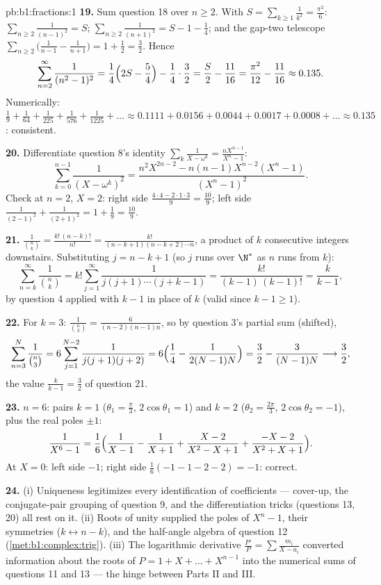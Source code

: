 \begin{solution}{pb:b1:fractions:1}
\textbf{19.} Sum question 18 over $n \geq 2$. With $S =
\sum_{k\geq1}\frac1{k^2} = \frac{\pi^2}6$: $\sum_{n\geq2}
\frac1{(n-1)^2} = S$; $\sum_{n\geq2}\frac1{(n+1)^2} = S - 1 -
\frac14$; and the gap-two telescope $\sum_{n\geq2}\bigl(
\frac1{n-1} - \frac1{n+1}\bigr) = 1 + \frac12 = \frac32$. Hence
\[
\sum_{n=2}^{\infty}\frac1{(n^2-1)^2}
= \frac14\Bigl(2S - \frac54\Bigr) - \frac14\cdot\frac32
= \frac S2 - \frac{11}{16}
= \frac{\pi^2}{12} - \frac{11}{16} \approx 0.135 .
\]
Numerically: $\frac19 + \frac1{64} + \frac1{225} + \frac1{576} +
\frac1{1225} + \dots \approx 0.1111 + 0.0156 + 0.0044 + 0.0017 +
0.0008 + \dots \approx 0.135$: consistent.

\textbf{20.} Differentiate question 8's identity
$\sum_k\frac1{X-\omega^k} = \frac{nX^{n-1}}{X^n-1}$:
\[
\sum_{k=0}^{n-1}\frac1{(X - \omega^k)^2}
= \frac{n^2X^{2n-2} - n(n-1)X^{n-2}(X^n - 1)}{(X^n - 1)^2} .
\]
Check at $n = 2$, $X = 2$: right side $\frac{4\cdot4 -
2\cdot1\cdot3}{9} = \frac{10}9$; left side $\frac1{(2-1)^2} +
\frac1{(2+1)^2} = 1 + \frac19 = \frac{10}9$.

\textbf{21.} $\frac1{\binom nk} = \frac{k!\,(n-k)!}{n!} =
\frac{k!}{(n-k+1)(n-k+2)\cdots n}$, a product of $k$ consecutive
integers downstairs. Substituting $j = n - k + 1$ (so $j$ runs
over $\N^*$ as $n$ runs from $k$):
\[
\sum_{n=k}^{\infty}\frac1{\binom nk}
= k!\sum_{j=1}^{\infty}\frac1{j(j+1)\cdots(j+k-1)}
= \frac{k!}{(k-1)\,(k-1)!} = \frac{k}{k-1} ,
\]
by question 4 applied with $k - 1$ in place of $k$ (valid since
$k - 1 \geq 1$).

\textbf{22.} For $k = 3$: $\frac1{\binom n3} =
\frac6{(n-2)(n-1)n}$, so by question 3's partial sum (shifted),
\[
\sum_{n=3}^{N}\frac1{\binom n3}
= 6\sum_{j=1}^{N-2}\frac1{j(j+1)(j+2)}
= 6\Bigl(\frac14 - \frac1{2(N-1)N}\Bigr)
= \frac32 - \frac3{(N-1)N}
\longrightarrow \frac32 ,
\]
the value $\frac k{k-1} = \frac32$ of question 21.

\textbf{23.} $n = 6$: pairs $k = 1$ ($\theta_1 = \frac\pi3$,
$2\cos\theta_1 = 1$) and $k = 2$ ($\theta_2 = \frac{2\pi}3$,
$2\cos\theta_2 = -1$), plus the real poles $\pm1$:
\[
\frac1{X^6-1} = \frac16\Bigl(\frac1{X-1} - \frac1{X+1}
+ \frac{X - 2}{X^2 - X + 1}
+ \frac{-X - 2}{X^2 + X + 1}\Bigr) .
\]
At $X = 0$: left side $-1$; right side $\frac16(-1 - 1 - 2 - 2)
= -1$: correct.

\textbf{24.} (i) Uniqueness legitimizes every identification of
coefficients --- cover-up, the conjugate-pair grouping of
question 9, and the differentiation tricks (questions 13, 20)
all rest on it. (ii) Roots of unity supplied the poles of $X^n -
1$, their symmetries ($k \leftrightarrow n-k$), and the
half-angle algebra of question 12
(\cref{met:b1:complex:trig}). (iii) The logarithmic derivative
$\frac{P'}P = \sum\frac{m_i}{X-a_i}$ converted information about
the roots of $P = 1 + X + \dots + X^{n-1}$ into the numerical
sums of questions 11 and 13 --- the hinge between Parts II and
III.


\end{solution}
